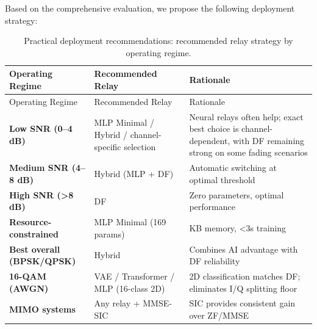 \documentclass[
  english,
  12pt,
  12pt,
  a4paper,
  oneside]{report}
\begin{document}
Based on the comprehensive evaluation, we propose the following deployment strategy:

\begin{longtable}[]{@{}
  >{\raggedright\arraybackslash}p{}
  >{\raggedright\arraybackslash}p{}
  >{\raggedright\arraybackslash}p{}@{}}
\caption{Practical deployment recommendations: recommended relay strategy by operating regime.}\label{tbl:table32}\tabularnewline
\toprule\noalign{}
\begin{minipage}[b]{\linewidth}\raggedright
Operating Regime
\end{minipage} & \begin{minipage}[b]{\linewidth}\raggedright
Recommended Relay
\end{minipage} & \begin{minipage}[b]{\linewidth}\raggedright
Rationale
\end{minipage} \\
\midrule\noalign{}
\endfirsthead
\toprule\noalign{}
\begin{minipage}[b]{\linewidth}\raggedright
Operating Regime
\end{minipage} & \begin{minipage}[b]{\linewidth}\raggedright
Recommended Relay
\end{minipage} & \begin{minipage}[b]{\linewidth}\raggedright
Rationale
\end{minipage} \\
\midrule\noalign{}
\endhead
\bottomrule\noalign{}
\endlastfoot
\textbf{Low SNR (0--4 dB)} & MLP Minimal / Hybrid / channel-specific selection & Neural relays often help; exact best choice is channel-dependent, with DF remaining strong on some fading scenarios \\
\textbf{Medium SNR (4--8 dB)} & Hybrid (MLP + DF) & Automatic switching at optimal threshold \\
\textbf{High SNR (\textgreater8 dB)} & DF & Zero parameters, optimal performance \\
\textbf{Resource-constrained} & MLP Minimal (169 params) & 0.7 KB memory, \textless3s training \\
\textbf{Best overall (BPSK/QPSK)} & Hybrid & Combines AI advantage with DF reliability \\
\textbf{16-QAM (AWGN)} & VAE / Transformer / MLP (16-class 2D) & 2D classification matches DF; eliminates I/Q splitting floor \\
\textbf{MIMO systems} & Any relay + MMSE-SIC & SIC provides consistent gain over ZF/MMSE \\
\end{longtable}
\end{document}
